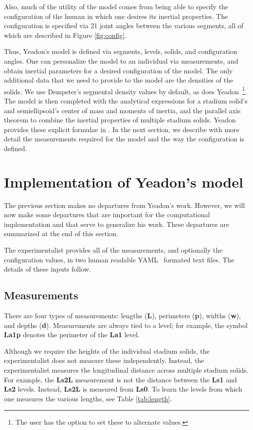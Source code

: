 \documentclass[10pt]{article}
\begin{document}
Also, much of the utility of the model comes from being able to specify the
configuration of the human in which one desires its inertial properties. The
configuration is specified via 21 joint angles between the various segments,
all of which are described in Figure \ref{fig:config}.

Thus, Yeadon's model is defined via segments, levels, solids, and configuration
angles. One can personalize the model to an individual via measurements, and
obtain inertial parameters for a desired configuration of the model. The only
additional data that we need to provide to the model are the densities of the
solids. We use Dempster's segmental density values \cite{Dempster1955} by
default, as does Yeadon~\footnote{The user has the option to set these to
alternate values.}. The model is then completed with the analytical
expressions for a stadium solid's and semiellipsoid's center of mass and
moments of inertia, and the parallel axis theorem to combine the inertial
properties of multiple stadium solids. Yeadon provides these explicit formulae
in \cite{Yeadon1990f}. In the next section, we describe with more detail the
measurements required for the model and the way the configuration is defined.

\section*{Implementation of Yeadon's model}

The previous section makes no departures from Yeadon's work. However, we will
now make some departures that are important for the computational
implementation and that serve to generalize his work. These departures are
summarized at the end of this section.

The experimentalist provides all of the measurements, and
optionally the configuration values, in two human readable YAML~\cite{YAML2014}
formated text files. The details of these inputs follow.

\subsection*{Measurements}

There are four types of measurements: lengths (\textbf{L}), perimeters
(\textbf{p}), widths (\textbf{w}), and depths (\textbf{d}). Measurements are
always tied to a level; for example, the symbol \textbf{La1p} denotes the
perimeter of the \textbf{La1} level.

Although we require the heights of the individual stadium solids, the
experimentalist does not measure these independently. Instead, the
experimentalist measures the longitudinal distance across multiple stadium
solids. For example, the \textbf{Ls2L} measurement is not the distance between
the \textbf{Ls1} and \textbf{Ls2} levels. Instead, \textbf{Ls2L} is measured
from \textbf{Ls0}. To learn the levels from which one measures the various
lengths, see Table \ref{tab:length}.
\end{document}
